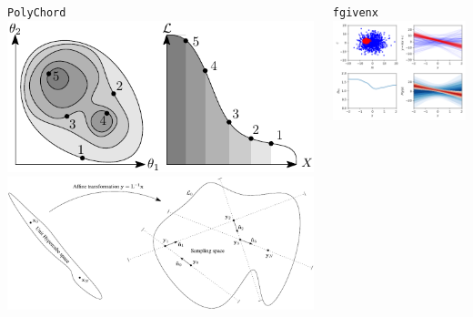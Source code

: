 \documentclass[aspectratio=169]{beamer}
\begin{document}
\begin{frame}
    \begin{columns}[t]
        \begin{block}{\texttt{PolyChord}}
            \includegraphics[width=\textwidth]{figures/polychord1.pdf}
            \includegraphics[width=\textwidth]{figures/polychord2.pdf}
        \end{block}
        
        \begin{block}{\texttt{fgivenx}}
            \includegraphics[width=\textwidth]{figures/fgivenx.png}
        \end{block}


\end{columns}
\end{frame}
\end{document}
